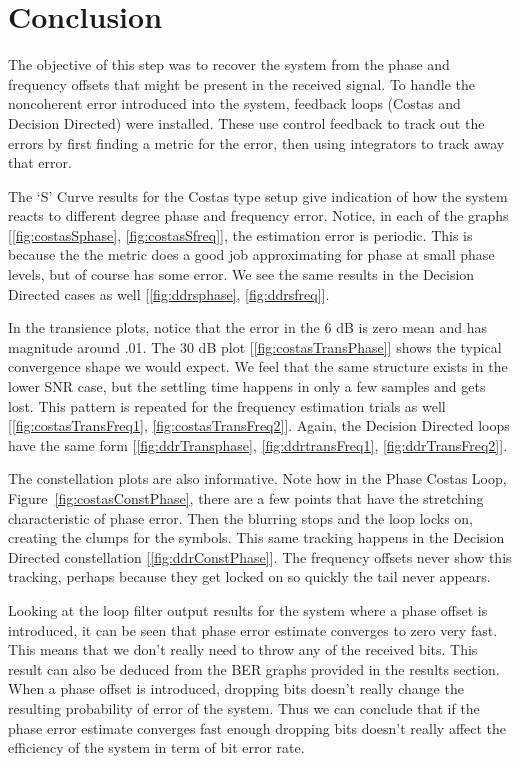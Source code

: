 \documentclass[]{article}
\begin{document}
\newpage
\section{Conclusion}
\label{sec:conc}

The objective of this step was to recover the system from the phase and frequency offsets that might be present in the received signal. To handle the noncoherent error introduced into the system, feedback loops (Costas and Decision Directed) were installed. These use control feedback to track out the errors by first finding a metric for the error, then using integrators to track away that error. 

The `S' Curve results for the Costas type setup give indication of how the system reacts to different degree phase and frequency error.  Notice, in each of the graphs [\ref{fig:costasSphase}, \ref{fig:costasSfreq}], the estimation error is periodic.  This is because the the metric does a good job approximating for phase at small phase levels, but of course has some error.  We see the same results in the Decision Directed cases as well [\ref{fig:ddrsphase}, \ref{fig:ddrsfreq}].

In the transience plots, notice that the error in the 6 dB is zero mean and has magnitude around .01.  The 30 dB plot [\ref{fig:costasTransPhase}]  shows the typical convergence shape we would expect.  We feel that the same structure exists in the lower SNR case, but the settling time happens in only a few samples and gets lost.  This pattern is repeated for the frequency estimation trials as well [\ref{fig:costasTransFreq1}, \ref{fig:costasTransFreq2}].  Again, the Decision Directed loops have the same form [\ref{fig:ddrTransphase}, \ref{fig:ddrtransFreq1}, \ref{fig:ddrTransFreq2}].

The constellation plots are also informative.  Note how in the Phase Costas Loop, Figure~\ref{fig:costasConstPhase}, there are a few points that have the stretching characteristic of phase error.  Then the blurring stops and the loop locks on, creating the clumps for the symbols.  This same tracking happens in the Decision Directed constellation [\ref{fig:ddrConstPhase}].  The frequency offsets never show this tracking, perhaps because they get locked on so quickly the tail never appears.

Looking at the loop filter output results for the system where a phase offset is introduced, it can be seen that phase error estimate converges to zero very fast. This means that we don't really need to throw any of the received bits. This result can also be deduced from the BER graphs provided in the results section. When a phase offset is introduced, dropping bits doesn't really change the resulting probability of error of the system. Thus we can conclude that if the phase error estimate converges fast enough dropping bits doesn't really affect the efficiency of the system in term of bit error rate. 
\end{document}
